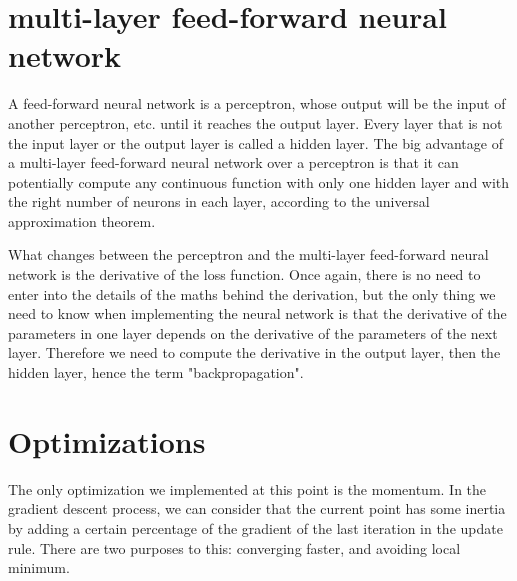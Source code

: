 \begin{center}
\end{center}

\section{multi-layer feed-forward neural network}

A feed-forward neural network is a perceptron, whose output will be the input of
another perceptron, etc. until it reaches the output layer. Every layer that is
not the input layer or the output layer is called a hidden layer. The big
advantage of a multi-layer feed-forward neural network over a perceptron is that
it can potentially compute any continuous function with only one hidden layer
and with the right number of neurons in each layer, according to the universal
approximation theorem.\\

\begin{center}
\end{center}

What changes between the perceptron and the multi-layer feed-forward neural
network is the derivative of the loss function. Once again, there is no need to
enter into the details of the maths behind the derivation, but the only thing we
need to know when implementing the neural network is that the derivative of the
parameters in one layer depends on the derivative of the parameters of the next
layer. Therefore we need to compute the derivative in the output layer, then the
hidden layer, hence the term "backpropagation".

\section{Optimizations}

The only optimization we implemented at this point is the momentum. In the
gradient descent process, we can consider that the current point has some
inertia by adding a certain percentage of the gradient of the last iteration in
the update rule. There are two purposes to this: converging faster, and avoiding
local minimum.
